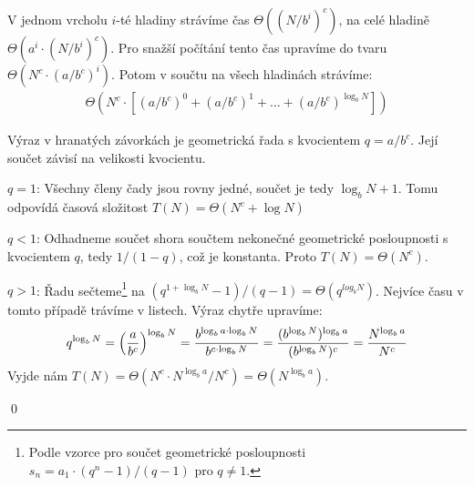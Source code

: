 V jednom vrcholu $i$-té hladiny strávíme čas $\Theta((N/b^i)^c)$, na celé
hladině $\Theta(a^i\cdot (N/b^i)^c)$. Pro snažší počítání tento čas upravíme do
tvaru $\Theta(N^c\cdot (a/b^c)^i)$. Potom v součtu na všech hladinách strávíme:
\begin{align*}
\Theta(N^c\cdot [(a/b^c)^0 + (a/b^c)^1 + \dots + (a/b^c)^{\log_b N} ])
\end{align*}

Výraz v hranatých závorkách je geometrická řada s kvocientem $q=a/b^c$. Její součet závisí na velikosti kvocientu.
\begin{itemize*}
\item $q = 1$: Všechny členy čady jsou rovny jedné, součet je tedy $\log_b N +
	1$. Tomu odpovídá časová složitost $T(N) = \Theta(N^c + \log N)$
\item $q < 1$: Odhadneme součet shora součtem nekonečné geometrické
	posloupnosti s kvocientem $q$, tedy $1/(1-q)$, což je konstanta. Proto
	$T(N) = \Theta(N^c)$.
\item $q > 1$: Řadu sečteme\footnote{Podle vzorce pro součet geometrické posloupnosti $s_n = a_1\cdot(q^n-1)/(q-1)$ pro $q\neq 1$.} na $(q^{1+\log_b N} - 1) / (q-1) = \Theta(q^{log_b N})$. Nejvíce času v tomto případě trávíme v listech. Výraz chytře upravíme:
\begin{align*}
q^{\log_b N} = \left(a\over b^c\right)^{\log_b N} = {b^{\log_b a\cdot\log_b N} \over b^{c\cdot\log_b N}} = {(b^{\log_b N})^{\log_b a} \over (b^{\log_b N})^c} = {N^{\log_b a}\over N^c}
\end{align*}
Vyjde nám $T(N) = \Theta(N^c\cdot N^{\log_b a} / N^c) = \Theta(N^{\log_b a})$.
\end{itemize*}
\qed

